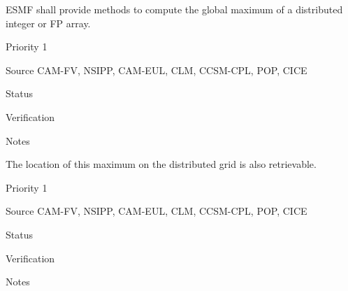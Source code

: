 






ESMF shall provide methods to compute the global maximum of a
distributed integer or FP array.

\begin{reqlist}
\item[Priority] 1
\item[Source] CAM-FV, NSIPP, CAM-EUL, CLM, CCSM-CPL, POP, CICE
\item[Status]
\item[Verification]
\item[Notes]
\end{reqlist}



The location of this maximum on the distributed grid is also
retrievable.

\begin{reqlist}
\item[Priority] 1
\item[Source] CAM-FV, NSIPP, CAM-EUL, CLM, CCSM-CPL, POP, CICE
\item[Status]
\item[Verification]
\item[Notes]
\end{reqlist}


